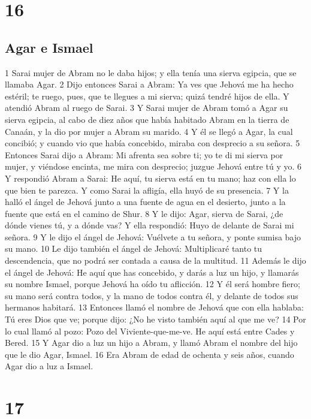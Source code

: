 \chapter{16}

\section*{Agar e Ismael}

1 Sarai mujer de Abram no le daba hijos; y ella tenía una sierva egipcia, que se llamaba Agar.
2 Dijo entonces Sarai a Abram: Ya ves que Jehová me ha hecho estéril; te ruego, pues, que te llegues a mi sierva; quizá tendré hijos de ella. Y atendió Abram al ruego de Sarai.
3 Y Sarai mujer de Abram tomó a Agar su sierva egipcia, al cabo de diez años que había habitado Abram en la tierra de Canaán, y la dio por mujer a Abram su marido.
4 Y él se llegó a Agar, la cual concibió; y cuando vio que había concebido, miraba con desprecio a su señora.
5 Entonces Sarai dijo a Abram: Mi afrenta sea sobre ti; yo te di mi sierva por mujer, y viéndose encinta, me mira con desprecio; juzgue Jehová entre tú y yo.
6 Y respondió Abram a Sarai: He aquí, tu sierva está en tu mano; haz con ella lo que bien te parezca. Y como Sarai la afligía, ella huyó de su presencia.
7 Y la halló el ángel de Jehová junto a una fuente de agua en el desierto, junto a la fuente que está en el camino de Shur.
8 Y le dijo: Agar, sierva de Sarai, ¿de dónde vienes tú, y a dónde vas? Y ella respondió: Huyo de delante de Sarai mi señora.
9 Y le dijo el ángel de Jehová: Vuélvete a tu señora, y ponte sumisa bajo su mano.
10 Le dijo también el ángel de Jehová: Multiplicaré tanto tu descendencia, que no podrá ser contada a causa de la multitud.
11 Además le dijo el ángel de Jehová: He aquí que has concebido, y darás a luz un hijo, y llamarás su nombre Ismael, porque Jehová ha oído tu aflicción.
12 Y él será hombre fiero; su mano será contra todos, y la mano de todos contra él, y delante de todos sus hermanos habitará.
13 Entonces llamó el nombre de Jehová que con ella hablaba: Tú eres Dios que ve; porque dijo: ¿No he visto también aquí al que me ve?
14 Por lo cual llamó al pozo: Pozo del Viviente-que-me-ve. He aquí está entre Cades y Bered.
15 Y Agar dio a luz un hijo a Abram, y llamó Abram el nombre del hijo que le dio Agar, Ismael.
16 Era Abram de edad de ochenta y seis años, cuando Agar dio a luz a Ismael.

\chapter{17}

